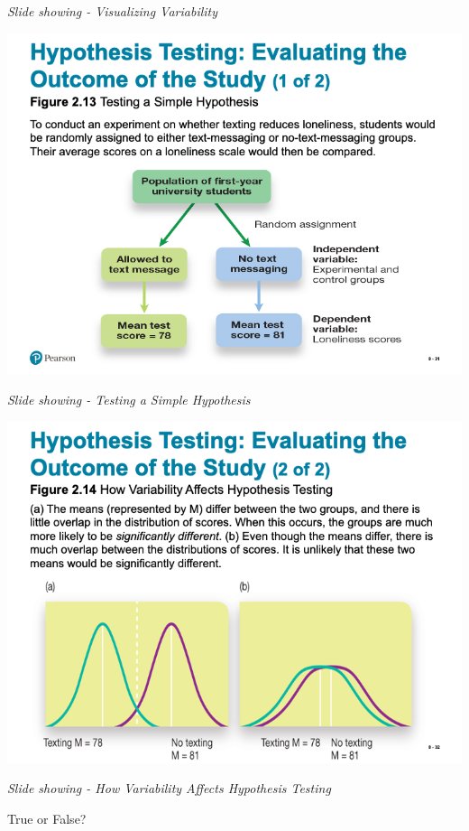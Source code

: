 \documentclass[
]{book}
\begin{document}
\begin{reflect}
\emph{Slide showing - Visualizing Variability}

\includegraphics{assets/unit_1/slide_31.png}

\emph{Slide showing - Testing a Simple Hypothesis}

\includegraphics{assets/unit_1/slide_32.png}

\emph{Slide showing - How Variability Affects Hypothesis Testing}

True or False?


\end{reflect}
\end{document}
